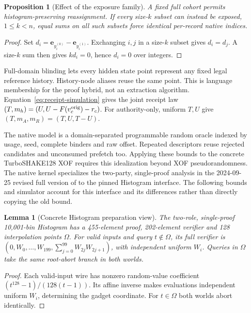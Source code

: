 \documentclass[conference,compsoc]{IEEEtran}
\theoremstyle{definition}
\numberwithin{equation}{section}
\numberwithin{table}{section}
\numberwithin{figure}{section}
\theoremstyle{plain}
\newtheorem{lemma}{Lemma}[section]
\newtheorem{proposition}{Proposition}[section]
\newtheorem{lemma}{Lemma}
\newtheorem{proposition}{Proposition}
\begin{document}
\begin{proposition}[Effect of the exposure family]
\label{prop:exposure-family}
A fixed full cohort permits histogram-preserving reassignment. If every
size-\(k\) subset can instead be exposed, \(1\le k<n\), equal sums on
all such subsets force identical per-record native indices.
\end{proposition}
\begin{proof}
Set \(d_i=\mathbf e_{y_i^{(0)}}-\mathbf e_{y_i^{(1)}}\).
Exchanging \(i,j\) in a size-\(k\) subset gives \(d_i=d_j\).
A size-\(k\) sum then gives \(kd_i=0\), hence \(d_i=0\) over integers.
\end{proof}

\label{lem:pedersen-language-lifting}
Full-domain blinding lets every hidden state point represent any fixed legal
reference history. History-node aliases reuse the same point. This is
language membership for the proof hybrid, not an extraction algorithm.
\label{lem:receipt-coupling}
Equation~\eqref{eq:receipt-simulation} gives the joint receipt law
\((T,m_h)=(U,U-F(v_c^{\rm orig})-r_c)\). For authority-only,
uniform \(T,U\) give \((T,m_A,m_R)=(T,U,T-U)\).

The native model is a domain-separated programmable random oracle indexed by
usage, seed, complete binders and raw offset. Repeated descriptors reuse rejected
candidates and unconsumed prefetch too. Applying these bounds to the concrete
TurboSHAKE128 XOF requires this idealization beyond XOF pseudorandomness.
The native kernel specializes the two-party, single-proof analysis in the
2024-09-25 revised full version of \cite{Davis2023VDAFPrivacy} to the
pinned Histogram interface. The following bounds and simulator account for
this interface and its differences rather than directly copying the old bound.

\begin{lemma}[Concrete Histogram preparation view]
\label{lem:concrete-histogram-view}
The two-role, single-proof 10,001-bin Histogram has a 455-element proof,
202-element verifier and 128 interpolation points \(\Omega\).
For valid inputs and query \(t\notin\Omega\), its full verifier is
\((0,W_0,\ldots,W_{199},\sum_{j=0}^{99}W_{2j}W_{2j+1})\), with
independent uniform \(W_i\). Queries in \(\Omega\) take the same root-abort
branch in both worlds.
\end{lemma}
\begin{proof}
Each valid-input wire has nonzero random-value coefficient
\((t^{128}-1)/(128(t-1))\). Its affine inverse makes evaluations
independent uniform \(W_i\), determining the gadget coordinate.
For \(t\in\Omega\) both worlds abort identically.
\end{proof}
\end{document}
